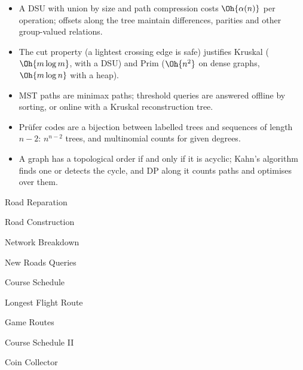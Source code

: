 \begin{summary}
\begin{itemize}
  \item A DSU with union by size and path compression costs $\Oh{\alpha(n)}$ per operation; offsets along the tree maintain
        differences, parities and other group-valued relations.
  \item The cut property (a lightest crossing edge is safe) justifies Kruskal ($\Oh{m \log m}$, with a DSU) and Prim
        ($\Oh{n^2}$ on dense graphs, $\Oh{m \log n}$ with a heap).
  \item MST paths are minimax paths; threshold queries are answered offline by sorting, or online with a Kruskal reconstruction
        tree.
  \item Prüfer codes are a bijection between labelled trees and sequences of length $n - 2$: $n^{n-2}$ trees, and multinomial
        counts for given degrees.
  \item A graph has a topological order if and only if it is acyclic; Kahn's algorithm finds one or detects the cycle, and DP
        along it counts paths and optimises over them.
\end{itemize}
\end{summary}

\begin{practice}
\begin{pplist}
  \item Road Reparation
  \item Road Construction
  \item Network Breakdown
  \item New Roads Queries
\end{pplist}
\begin{pplist}
  \item Course Schedule
  \item Longest Flight Route
  \item Game Routes
  \item Course Schedule II
  \item Coin Collector
\end{pplist}
\end{practice}
